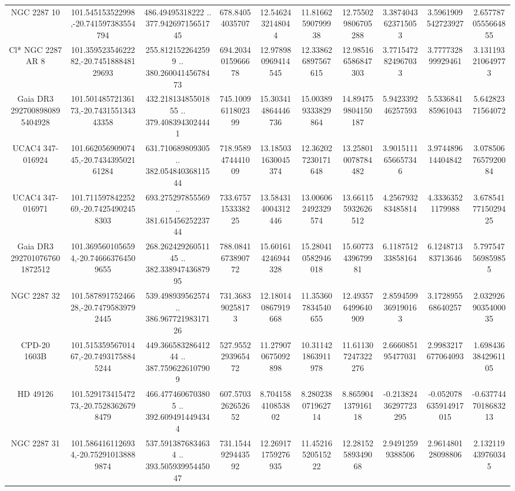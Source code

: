 \begin{table}
\begin{tabular}{cccccccccc}
NGC  2287    10 & 101.545153522998,-20.741597383554794 & 486.49495318222 .. 377.94269715651745 & 678.84054035707 & 12.5462432148044 & 11.81662590799938 & 12.755029806705288 & 3.3874043623715053 & 3.5961909542723927 & 2.6577870555664855 \\
Cl* NGC 2287     AR       8 & 101.35952354622282,-20.745188848129693 & 255.8121522642599 .. 380.26004145678473 & 694.2034015966678 & 12.978980969414545 & 12.338626897567615 & 12.985166586847303 & 3.7715472824967033 & 3.777732899929461 & 3.131193210649773 \\
Gaia DR3 2927008980895404928 & 101.50148572136173,-20.743155134343358 & 432.21813485501855 .. 379.4083943024441 & 745.1009611802399 & 15.303414864446736 & 15.003899333829864 & 14.894759804150187 & 5.942339246257593 & 5.533684185961043 & 5.64282371564072 \\
UCAC4 347-016924 & 101.66205690907445,-20.743439502161284 & 631.710689809305 .. 382.05484036811544 & 718.9589474441009 & 13.185031630045374 & 12.362027230171648 & 13.258010078784482 & 3.9015111656657346 & 3.974489614404842 & 3.0785067657920084 \\
UCAC4 347-016971 & 101.71159784225269,-20.74254902458303 & 693.275297855569 .. 381.61545625223744 & 733.6757153338225 & 13.584314004312446 & 13.006062492329574 & 13.661155932626512 & 4.256793283485814 & 4.33363521179988 & 3.6785417715029425 \\
Gaia DR3 2927010767601872512 & 101.3695601056594,-20.746663764509655 & 268.26242926051145 .. 382.33894743687995 & 788.0841673890772 & 15.601614246944328 & 15.280410582946018 & 15.60773439679981 & 6.118751233858164 & 6.124871383713646 & 5.797547569859855 \\
NGC  2287    32 & 101.58789175246628,-20.74795839792445 & 539.498939562574 .. 386.96772198317126 & 731.368390258173 & 12.180140867919668 & 11.353607834540655 & 12.493576499640909 & 2.8594599369190163 & 3.172895568640257 & 2.0329269035400035 \\
CPD-20  1603B & 101.51535956701467,-20.74931758845244 & 449.36658328641244 .. 387.7596226107909 & 527.9552293965472 & 11.279070675092898 & 10.311421863911978 & 11.611307247322276 & 2.666085195477031 & 2.9983217677064093 & 1.6984363842961105 \\
HD  49126 & 101.52917341547273,-20.75283626798479 & 466.4774606703805 .. 392.6094914494344 & 607.5703262652652 & 8.704158410853802 & 8.280238071962714 & 8.865904137916118 & -0.21382436297723295 & -0.052078635914917015 & -0.6377447018683213 \\
NGC  2287    31 & 101.5864161126934,-20.752910138889874 & 537.5913876834634 .. 393.50593995445047 & 731.1544929443592 & 12.269171759276935 & 11.45216520515222 & 12.28152589349068 & 2.94912599388506 & 2.961480128098806 & 2.132119439760345 \\

\end{tabular}
\end{table}
